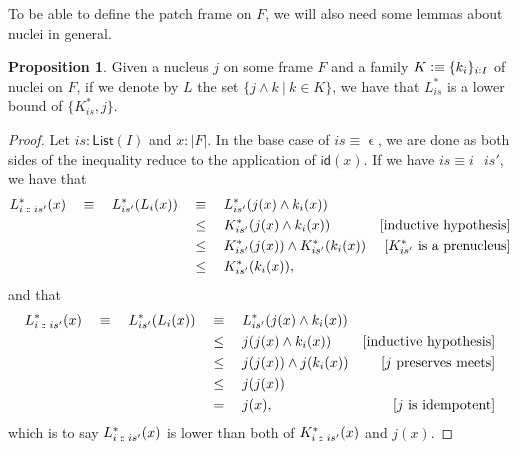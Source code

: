 \documentclass[a4paper, 11pt]{article}
\theoremstyle{definition}
\newtheorem{prop}{Proposition}
\newcommand{\is}{\vcentcolon\equiv}
\DeclareMathOperator{\emptyl}{\epsilon}
\DeclareMathOperator{\cons}{\colon\kern-1.1ex\colon\kern-0.4ex}
\DeclareMathOperator{\append}{\,}
\begin{document}
To be able to define the patch frame on $F$, we will also need some lemmas about nuclei in general.

\begin{prop}
  Given a nucleus $j$ on some frame $F$ and a family $K \is \{ k_i \}_{i : I}$ of nuclei on $F$, if
  we denote by $L$ the set $\{ j \wedge k ~|~ k \in K \}$, we have that $L^*_{is}$ is a lower bound of
  $\{ K^*_{is}, j \}$.
\end{prop}
\begin{proof}
  Let $is : \mathsf{List}(I)$ and $x : | F |$. In the base case of $is \equiv \emptyl$, we are done
  as both sides of the inequality reduce to the application of $\mathsf{id}(x)$. If we have
  $is \equiv i \append is'$, we have that
  \begin{align*}
    L^*_{i \cons is'}(x)
      \quad\equiv\quad L^*_{is'}(L_i(x))
     &\quad\equiv\quad L^*_{is'}(j(x) \wedge k_i(x)) \\
     &\quad\le\quad K^*_{is'}(j(x) \wedge k_i(x)) & [\text{inductive hypothesis}] \\
     &\quad\le\quad K^*_{is'}(j(x)) \wedge K^*_{is'}(k_i(x)) & [K^*_{is'}\ \text{is a prenucleus}] \\
     &\quad\le\quad K^*_{is'}(k_i(x)),
  \end{align*}
  and that
  \begin{align*}
    L^*_{i \cons is'}(x)
    \quad\equiv\quad L^*_{is'}(L_i(x)) 
    &\quad\equiv\quad L^*_{is'}(j(x) \wedge k_i(x)) & \\
    &\quad\le\quad j(j(x) \wedge k_i(x)) & [\text{inductive hypothesis}] \\
    &\quad\le\quad j(j(x)) \wedge j(k_i(x)) & [\text{$j$ preserves meets}]\\
    &\quad\le\quad j(j(x)) & \\
    &\quad=\quad j(x), & [\text{$j$ is idempotent}]
  \end{align*}
  which is to say $L^*_{i \cons is'}(x)$ is lower than both of $K^*_{i \cons is'}(x)$ and $j(x)$.
\end{proof}
\end{document}
